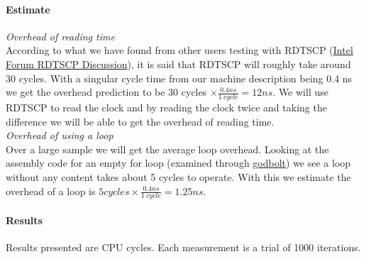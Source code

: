 \paragraph{Estimate}
\textit{Overhead of reading time}\\
According to what we have found from other users testing with RDTSCP (\href{https://community.intel.com/t5/Software-Tuning-Performance/High-impact-of-rdtsc/td-p/1092539}{Intel Forum RDTSCP Discussion}), it is said that RDTSCP will roughly take around 30 cycles. With a singular cycle time from our machine description being 0.4 ns we get the overhead prediction to be $30$ cycles $\times \frac{0.4 ns}{1\ cycle} = 12 ns$. We will use RDTSCP to read the clock and by reading the clock twice and taking the difference we will be able to get the overhead of reading time.
 \\
  \textit{Overhead of using a loop} \\
 Over a large sample we will get the average loop overhead. Looking at the assembly code for an empty for loop (examined through \href{https://godbolt.org/z/Por6xoP41}{godbolt}) we see a loop without any content takes about 5 cycles to operate. With this we estimate the overhead of a loop is $5 cycles \times \frac{0.4 ns}{1\ cycle} = 1.25 ns$.

\paragraph{Results}

Results presented are CPU cycles. Each measurement is a trial of 1000 iterations.

